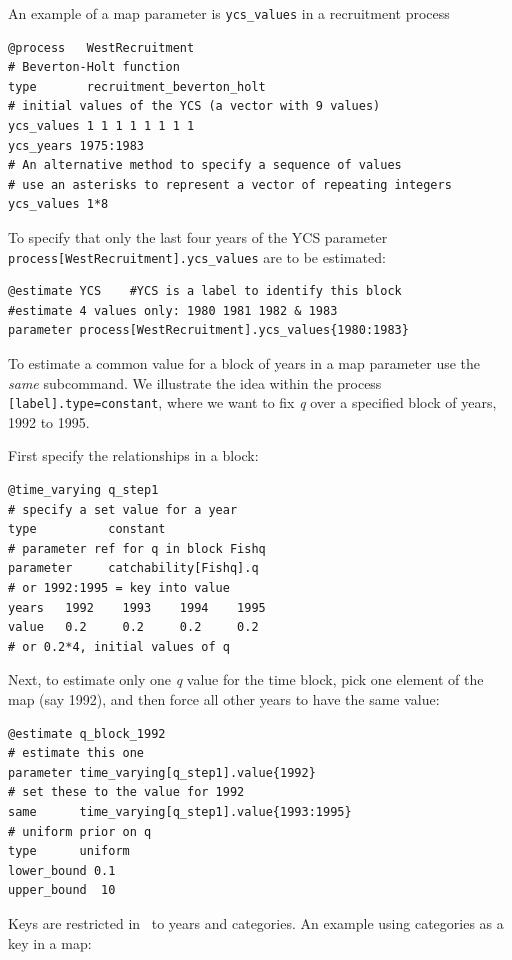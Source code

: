 An example of a map parameter is \texttt{ycs\_values} in a recruitment process

{\small{\begin{verbatim}
@process   WestRecruitment
# Beverton-Holt function
type       recruitment_beverton_holt
# initial values of the YCS (a vector with 9 values)
ycs_values 1 1 1 1 1 1 1 1
ycs_years 1975:1983
# An alternative method to specify a sequence of values
# use an asterisks to represent a vector of repeating integers
ycs_values 1*8
\end{verbatim}}}

To specify that only the last four years of the YCS parameter \texttt{process[WestRecruitment].ycs\_values} are to be  estimated:

{\small{\begin{verbatim}
@estimate YCS    #YCS is a label to identify this block
#estimate 4 values only: 1980 1981 1982 & 1983
parameter process[WestRecruitment].ycs_values{1980:1983}
\end{verbatim}}}

To estimate a common value for a block of years in a map parameter use the \textit{same} subcommand. We illustrate the idea within the process \texttt{[label].type=constant}, where we want to fix \textit{q} over a specified block of years, 1992 to 1995.

First specify the relationships in a  block:

{\small{\begin{verbatim}
@time_varying q_step1
# specify a set value for a year
type          constant
# parameter ref for q in block Fishq
parameter     catchability[Fishq].q
# or 1992:1995 = key into value
years 	1992	1993	1994	1995
value 	0.2		0.2		0.2		0.2
# or 0.2*4, initial values of q
\end{verbatim}}}

Next, to estimate only one \textit{q} value for the time block, pick one element of the map (say 1992), and then force all other years to have the same value:

{\small{\begin{verbatim}
@estimate q_block_1992
# estimate this one
parameter time_varying[q_step1].value{1992}
# set these to the value for 1992
same      time_varying[q_step1].value{1993:1995}
# uniform prior on q
type      uniform
lower_bound 0.1
upper_bound  10
\end{verbatim}}}

Keys are restricted in \CNAME\ to years and categories. An example using categories as a key in a map:

